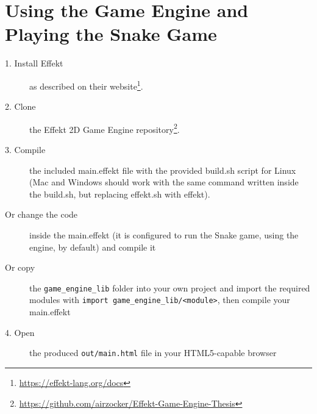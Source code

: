 \chapter{Using the Game Engine and Playing the Snake Game}

\begin{description}
\item[1. Install Effekt] as described on their website\footnote{\url{https://effekt-lang.org/docs}}.
\item[2. Clone] the Effekt 2D Game Engine repository\footnote{\url{https://github.com/airzocker/Effekt-Game-Engine-Thesis}}.
\item[3. Compile] the included \textsf{main.effekt} file with the provided \textsf{build.sh} script for Linux (Mac and Windows should work with the same command written inside the \textsf{build.sh}, but replacing \textsf{effekt.sh} with \textsf{effekt}).
\item[Or change the code] inside the \textsf{main.effekt} (it is configured to run the Snake game, using the engine, by default) and compile it
\item[Or copy] the \verb^game_engine_lib^ folder into your own project and import the required modules with \verb^import game_engine_lib/<module>^, then compile your \textsf{main.effekt}
\item[4. Open] the produced \verb^out/main.html^ file in your HTML5-capable browser
\end{description}
